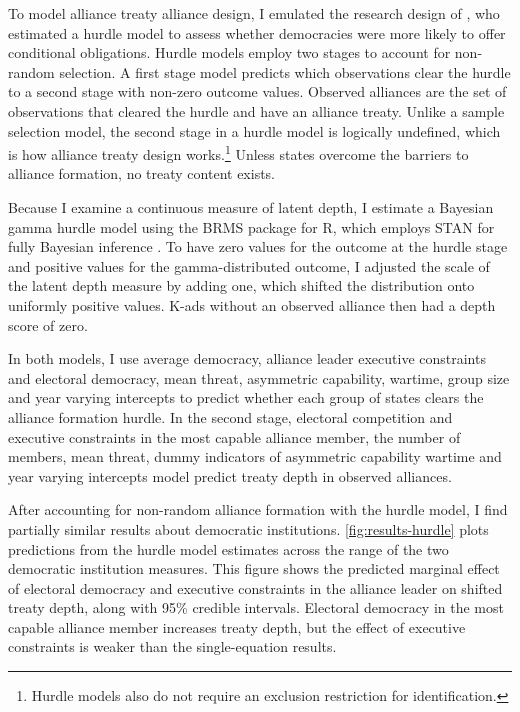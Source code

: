 \documentclass[12pt]{article}
\begin{document}
To model alliance treaty alliance design, I emulated the research design of \citet{Chibaetal2015}, who estimated a hurdle model to assess whether democracies were more likely to offer conditional obligations.
Hurdle models employ two stages to account for non-random selection.
A first stage model predicts which observations clear the hurdle to a second stage with non-zero outcome values. 
Observed alliances are the set of observations that cleared the hurdle and have an alliance treaty. 
Unlike a sample selection model, the second stage in a hurdle model is logically undefined, which is how alliance treaty design works.\footnote{Hurdle models also do not require an exclusion restriction for identification.} 
Unless states overcome the barriers to alliance formation, no treaty content exists. 


Because I examine a continuous measure of latent depth, I estimate a Bayesian gamma hurdle model using the BRMS package for \textsf{R}, which employs STAN for fully Bayesian inference \citep{Buerkner2017}.
To have zero values for the outcome at the hurdle stage and positive values for the gamma-distributed outcome, I adjusted the scale of the latent depth measure by adding one, which shifted the distribution onto uniformly positive values. 
K-ads without an observed alliance then had a depth score of zero. 


In both models, I use average democracy, alliance leader executive constraints and electoral democracy, mean threat, asymmetric capability, wartime, group size and year varying intercepts to predict whether each group of states clears the alliance formation hurdle.
In the second stage, electoral competition and executive constraints in the most capable alliance member, the number of members, mean threat, dummy indicators of asymmetric capability wartime and year varying intercepts model predict treaty depth in observed alliances. 


After accounting for non-random alliance formation with the hurdle model, I find partially similar results about democratic institutions. 
\autoref{fig:results-hurdle} plots predictions from the hurdle model estimates across the range of the two democratic institution measures. 
This figure shows the predicted marginal effect of electoral democracy and executive constraints in the alliance leader on shifted treaty depth, along with 95\% credible intervals.
Electoral democracy in the most capable alliance member increases treaty depth, but the effect of executive constraints is weaker than the single-equation results.  
\end{document}
